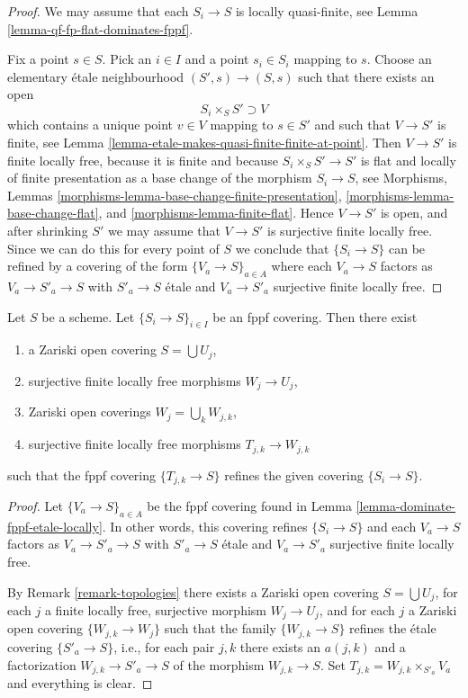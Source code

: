 \begin{proof}
We may assume that each $S_i \to S$ is locally quasi-finite, see
Lemma \ref{lemma-qf-fp-flat-dominates-fppf}.

\medskip\noindent
Fix a point $s \in S$. Pick an $i \in I$ and a point
$s_i \in S_i$ mapping to $s$. Choose an elementary \'etale neighbourhood
$(S', s) \to (S, s)$ such that there exists an open
$$
S_i \times_S S'  \supset V
$$
which contains a unique point $v \in V$ mapping to $s \in S'$
and such that $V \to S'$ is finite, see
Lemma \ref{lemma-etale-makes-quasi-finite-finite-at-point}.
Then $V \to S'$ is finite locally free, because it is finite
and because $S_i \times_S S' \to S'$ is flat and locally of finite presentation
as a base change of the morphism $S_i \to S$, see
Morphisms, Lemmas \ref{morphisms-lemma-base-change-finite-presentation},
\ref{morphisms-lemma-base-change-flat}, and
\ref{morphisms-lemma-finite-flat}.
Hence $V \to S'$ is open, and after shrinking $S'$
we may assume that $V \to S'$ is surjective finite locally free.
Since we can do this for every point of $S$ we conclude that
$\{S_i \to S\}$ can be refined by a covering of the form
$\{V_a \to S\}_{a \in A}$ where each $V_a \to S$ factors as
$V_a \to S'_a \to S$ with $S'_a \to S$ \'etale and $V_a \to S'_a$ surjective
finite locally free.
\end{proof}

\begin{lemma}
\label{lemma-dominate-fppf}
Let $S$ be a scheme. Let $\{S_i \to S\}_{i \in I}$ be an fppf covering.
Then there exist
\begin{enumerate}
\item a Zariski open covering $S = \bigcup U_j$,
\item surjective finite locally free morphisms $W_j \to U_j$,
\item Zariski open coverings $W_j = \bigcup_k W_{j, k}$,
\item surjective finite locally free morphisms $T_{j, k} \to W_{j, k}$
\end{enumerate}
such that the fppf covering $\{T_{j, k} \to S\}$ refines the given
covering $\{S_i \to S\}$.
\end{lemma}

\begin{proof}
Let $\{V_a \to S\}_{a \in A}$ be the fppf covering found in
Lemma \ref{lemma-dominate-fppf-etale-locally}.
In other words, this covering refines
$\{S_i \to S\}$
and each $V_a \to S$ factors as
$V_a \to S'_a \to S$ with $S'_a \to S$ \'etale and $V_a \to S'_a$
surjective finite locally free.

\medskip\noindent
By
Remark \ref{remark-topologies}
there exists a Zariski open covering $S = \bigcup U_j$,
for each $j$ a finite locally free, surjective morphism
$W_j \to U_j$, and for each $j$ a Zariski open covering
$\{W_{j, k} \to W_j\}$ such that the family
$\{W_{j, k} \to S\}$ refines the \'etale covering
$\{S'_a \to S\}$, i.e., for each pair $j, k$ there exists
an $a(j, k)$ and a factorization $W_{j, k} \to S'_a \to S$
of the morphism $W_{j, k} \to S$. Set
$T_{j, k} = W_{j, k} \times_{S'_a} V_a$ and everything is clear.
\end{proof}


